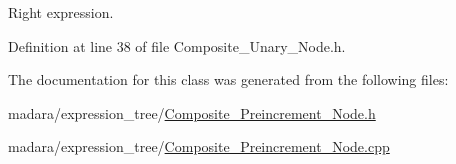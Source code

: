 Right expression. 



Definition at line 38 of file Composite\_\-Unary\_\-Node.h.



The documentation for this class was generated from the following files:\begin{DoxyCompactItemize}
\item 
madara/expression\_\-tree/\hyperlink{Composite__Preincrement__Node_8h}{Composite\_\-Preincrement\_\-Node.h}\item 
madara/expression\_\-tree/\hyperlink{Composite__Preincrement__Node_8cpp}{Composite\_\-Preincrement\_\-Node.cpp}\end{DoxyCompactItemize}
